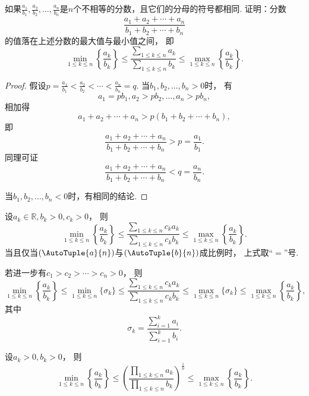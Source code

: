 \begin{example}\label{example:不等式.不同浓度的溶液的混合}
如果\(\frac{a_1}{b_1},\frac{a_2}{b_2},\dotsc,\frac{a_n}{b_n}\)是\(n\)个不相等的分数，且它们的分母的符号都相同.
证明：分数\[
	\frac{a_1+a_2+\dotsb+a_n}{b_1+b_2+\dotsb+b_n}
\]的值落在上述分数的最大值与最小值之间，
即\begin{equation}
	\min_{1 \leq k \leq n}\left\{ \frac{a_k}{b_k} \right\}
	\leq
	\frac{\sum_{1 \leq k \leq n} a_k}{\sum_{1 \leq k \leq n} b_k}
	\leq
	\max_{1 \leq k \leq n}\left\{ \frac{a_k}{b_k} \right\}.
\end{equation}
\begin{proof}
假设\(p=\frac{a_1}{b_1}<\frac{a_2}{b_2}<\dotsb<\frac{a_n}{b_n}=q\).
当\(b_1,b_2,\dotsc,b_n>0\)时，
有\[
	a_1 = p b_1,
	a_2 > p b_2,
	\dotsc,
	a_n > p b_n,
\]
相加得\[
	a_1 + a_2 + \dotsb + a_n > p(b_1 + b_2 + \dotsb + b_n),
\]
即\[
	\frac{a_1+a_2+\dotsb+a_n}{b_1+b_2+\dotsb+b_n} > p = \frac{a_1}{b_1}.
\]
同理可证\[
	\frac{a_1+a_2+\dotsb+a_n}{b_1+b_2+\dotsb+b_n} < q = \frac{a_n}{b_n}.
\]

当\(b_1,b_2,\dotsc,b_n<0\)时，有相同的结论.
\end{proof}
\end{example}
\begin{theorem}
设\(a_k\in\mathbb{R},b_k>0,c_k>0\)，
则\begin{equation}
	\min_{1 \leq k \leq n}\left\{ \frac{a_k}{b_k} \right\}
	\leq
	\frac{
		\sum_{1 \leq k \leq n} c_k a_k
	}{
		\sum_{1 \leq k \leq n} c_k b_k
	}
	\leq
	\max_{1 \leq k \leq n}\left\{ \frac{a_k}{b_k} \right\}.
\end{equation}
当且仅当\((\AutoTuple{a}{n})\)与\((\AutoTuple{b}{n})\)成比例时，
上式取“\(=\)”号.

若进一步有\(c_1 > c_2 > \dotsb > c_n > 0\)，
则\begin{equation}
	\min_{1 \leq k \leq n}\left\{ \frac{a_k}{b_k} \right\}
	\leq
	\min_{1 \leq k \leq n}\{\sigma_k\}
	\leq
	\frac{
		\sum_{1 \leq k \leq n} c_k a_k
	}{
		\sum_{1 \leq k \leq n} c_k b_k
	}
	\leq
	\max_{1 \leq k \leq n}\{\sigma_k\}
	\leq
	\max_{1 \leq k \leq n}\left\{ \frac{a_k}{b_k} \right\},
\end{equation}
其中\[
	\sigma_k = \frac{
		\sum_{i=1}^k a_i
	}{
		\sum_{i=1}^k b_i
	}.
\]
\end{theorem}
\begin{theorem}
设\(a_k>0,b_k>0\)，
则\begin{equation}
	\min_{1 \leq k \leq n}\left\{ \frac{a_k}{b_k} \right\}
	\leq
	\left(
		\frac{
			\prod_{1 \leq k \leq n} a_k
		}{
			\prod_{1 \leq k \leq n} b_k
		}
	\right)^{\frac1n}
	\leq
	\max_{1 \leq k \leq n}\left\{ \frac{a_k}{b_k} \right\}.
\end{equation}
\end{theorem}

